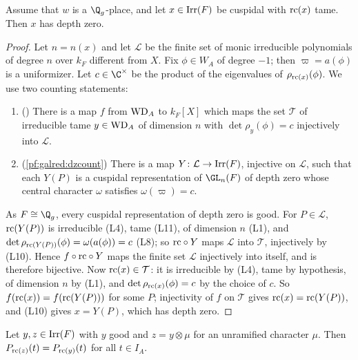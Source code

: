 \begin{lemma}\label{pf:galred:dzcusp}
Assume that $w$ is a $\Q_g$-place, and let $x\in\operatorname{Irr}(F)$ be cuspidal with $\mathrm{rc}(x)$ tame. Then $x$ has
depth zero.
\end{lemma}

\begin{proof}
Let $n=n(x)$ and let $\mathcal L$ be the finite set of monic irreducible polynomials of degree $n$ over $k_F$
different from $X$. Fix $\phi\in W_A$ of degree $-1$; then $\varpi=a(\phi)$ is a uniformizer. Let $c\in\C^\times$ be
the product of the eigenvalues of $\rho_{\mathrm{rc}(x)}(\phi)$. We use two counting statements:
\begin{enumerate}[label=(\roman*),nosep]
\item () There is a map $f$ from
  $\mathrm{WD}_A$ to $k_F[X]$ which maps the set $\mathcal T$ of irreducible tame $y\in\mathrm{WD}_A$ of dimension
  $n$ with $\det\rho_y(\phi)=c$ injectively into $\mathcal L$.
\item (\cref{pf:galred:dzcount}) There is a map $Y\colon\mathcal L\to\operatorname{Irr}(F)$,
  injective on $\mathcal L$, such that each $Y(P)$ is a cuspidal representation of $\GL_n(F)$ of depth zero
  whose central character $\omega$ satisfies $\omega(\varpi)=c$.
\end{enumerate}
As $F\cong\Q_g$, every cuspidal representation of depth zero is good. For $P\in\mathcal L$, $\mathrm{rc}(Y(P))$ is
irreducible (L4), tame (L11), of dimension $n$ (L1), and $\det\rho_{\mathrm{rc}(Y(P))}(\phi)=\omega(a(\phi))=c$ (L8); so
$\mathrm{rc}\circ Y$ maps $\mathcal L$ into $\mathcal T$, injectively by (L10). Hence $f\circ\mathrm{rc}\circ Y$ maps the
finite set $\mathcal L$ injectively into itself, and is therefore bijective. Now $\mathrm{rc}(x)\in\mathcal T$: it is
irreducible by (L4), tame by hypothesis, of dimension $n$ by (L1), and $\det\rho_{\mathrm{rc}(x)}(\phi)=c$ by the choice of
$c$. So $f(\mathrm{rc}(x))=f(\mathrm{rc}(Y(P)))$ for some $P$; injectivity of $f$ on $\mathcal T$ gives
$\mathrm{rc}(x)=\mathrm{rc}(Y(P))$, and (L10) gives $x=Y(P)$, which has depth zero.
\end{proof}

\begin{lemma}\label{pf:galred:inert}
Let $y,z\in\operatorname{Irr}(F)$ with $y$ good and $z=y\otimes\mu$ for an unramified character $\mu$. Then
$P_{\mathrm{rc}(z)}(t)=P_{\mathrm{rc}(y)}(t)$ for all $t\in I_A$.
\end{lemma}

